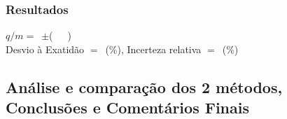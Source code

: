 \documentclass[a4paper,12pt]{article}  %
\begin{document}
\subsubsection{\sf Resultados}
\noindent  $q/m =$~\underline{\makebox[1.5cm][r]{~}}$\pm$\underline{\makebox[1cm][r]{~}}(~~~)\\


\noindent  Desvio à Exatidão $=$~\underline{\makebox[1cm][r]{~}}(\%), 
Incerteza relativa $=$~\underline{\makebox[1cm][r]{~}}($\%$) 


\subsection{\sf Análise e comparação dos 2 métodos, Conclusões e Comentários Finais}
\noindent\underline{\makebox[\textwidth][r]{~}} \\
\noindent\underline{\makebox[\textwidth][r]{~}} \\
\noindent\underline{\makebox[\textwidth][r]{~}} \\
\noindent\underline{\makebox[\textwidth][r]{~}} \\
\noindent\underline{\makebox[\textwidth][r]{~}} \\
\noindent\underline{\makebox[\textwidth][r]{~}} \\
\noindent\underline{\makebox[\textwidth][r]{~}} \\
\noindent\underline{\makebox[\textwidth][r]{~}} \\
\noindent\underline{\makebox[\textwidth][r]{~}} \\
\noindent\underline{\makebox[\textwidth][r]{~}} \\
\noindent\underline{\makebox[\textwidth][r]{~}} \\
\noindent\underline{\makebox[\textwidth][r]{~}} \\
\noindent\underline{\makebox[17cm][r]{~}} \\



\end{document}
